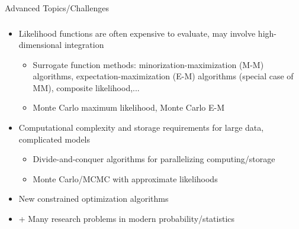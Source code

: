\documentclass{beamer}
\begin{document}
\begin{frame}{Advanced Topics/Challenges}
\frametitle{}
\begin{itemize}
\item Likelihood functions are often expensive to evaluate, may
  involve high-dimensional integration
\begin{itemize}
\item Surrogate function methods: minorization-maximization (M-M) algorithms,
  expectation-maximization (E-M) algorithms (special case of MM),
  composite likelihood,...
\item Monte Carlo maximum likelihood, Monte Carlo E-M
\end{itemize}
\item Computational complexity and storage requirements for large
  data, complicated models
\begin{itemize}
\item Divide-and-conquer algorithms for parallelizing
  computing/storage
\item Monte Carlo/MCMC with approximate likelihoods
\end{itemize}
\item New constrained optimization algorithms 
\item + Many research problems in modern probability/statistics
\end{itemize}
\end{frame}
\end{document}

